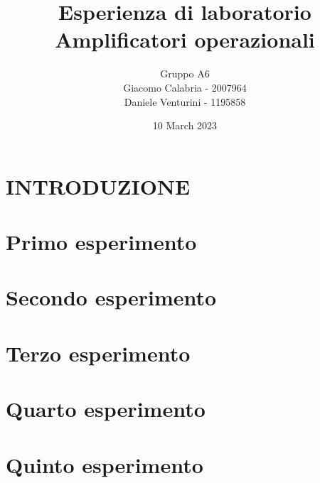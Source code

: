 \documentclass{article}
\title{Esperienza di laboratorio\\\textbf{Amplificatori operazionali}}
\author{Gruppo A6\\Giacomo Calabria - 2007964\\Daniele Venturini - 1195858}
\date{10 March 2023}
\begin{document}
    \maketitle
    \tableofcontents
    
    \section*{INTRODUZIONE}
    
    \clearpage
    
    \section{Primo esperimento}
    
    \clearpage
    
    \section{Secondo esperimento}
    
    \clearpage
    
    \section{Terzo esperimento}
    
    \clearpage
    
    \section{Quarto esperimento}
    
    \clearpage
    
    \section{Quinto esperimento}
    
\end{document}
